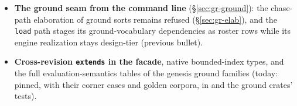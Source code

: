 \begin{itemize}
(\S\ref{sec:gr-caps}).
\item \textbf{The ground seam from the command line}
(\S\ref{sec:gr-ground}): the chase-path elaboration of ground sorts
remains refused (\S\ref{sec:gr-elab}), and the \texttt{load} path
stages its ground-vocabulary dependencies as roster rows while its
engine realization stays design-tier (previous bullet).
\item \textbf{Cross-revision \texttt{extends} in the facade}, native
bounded-index types, and the full evaluation-semantics tables of the
genesis ground families (today: pinned, with their corner cases and
golden corpora, in  and the ground
crates' tests).
\end{itemize}

